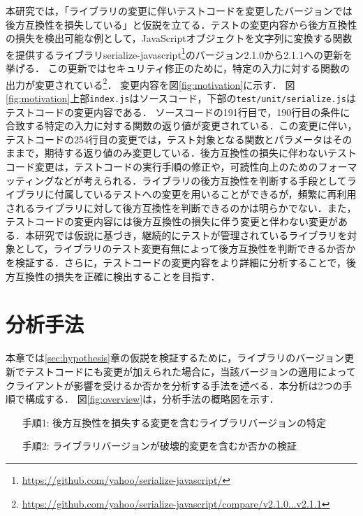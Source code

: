 \documentclass[submit]{ipsj}
\begin{document}

本研究では，「ライブラリの変更に伴いテストコードを変更したバージョンでは後方互換性を損失している」と仮説を立てる．テストの変更内容から後方互換性の損失を検出可能な例として，JavaScriptオブジェクトを文字列に変換する関数を提供するライブラリserialize-javascript\footnote{\url{https://github.com/yahoo/serialize-javascript/}}のバージョン2.1.0から2.1.1への更新を挙げる．
この更新ではセキュリティ修正のために，特定の入力に対する関数の出力が変更されている\footnote{\url{https://github.com/yahoo/serialize-javascript/compare/v2.1.0...v2.1.1}}．
変更内容を図\ref{fig:motivation}に示す．
図\ref{fig:motivation}上部{\verb|index.js|}はソースコード，下部の{\verb|test/unit/serialize.js|}はテストコードの変更内容である．
ソースコードの191行目で，190行目の条件に合致する特定の入力に対する関数の返り値が変更されている．この変更に伴い，テストコードの254行目の変更では，テスト対象となる関数とパラメータはそのままで，期待する返り値のみ変更している．後方互換性の損失に伴わないテストコード変更は，テストコードの実行手順の修正や，可読性向上のためのフォーマッティングなどが考えられる．ライブラリの後方互換性を判断する手段としてライブラリに付属しているテストへの変更を用いることができるが，頻繁に再利用されるライブラリに対して後方互換性を判断できるのかは明らかでない．また，テストコードの変更内容には後方互換性の損失に伴う変更と伴わない変更がある．本研究では仮説に基づき，継続的にテストが管理されているライブラリを対象として，ライブラリのテスト変更有無によって後方互換性を判断できるか否かを検証する．さらに，テストコードの変更内容をより詳細に分析することで，後方互換性の損失を正確に検出することを目指す．

\section{分析手法}
\label{sec:analyticalMethod}

本章では\ref{sec:hypothesis}章の仮説を検証するために，ライブラリのバージョン更新でテストコードにも変更が加えられた場合に，当該バージョンの適用によってクライアントが影響を受けるか否かを分析する手法を述べる．本分析は2つの手順で構成する．
図\ref{fig:overview}は，分析手法の概略図を示す．

\begin{enumerate}
\item[手順1: ] 後方互換性を損失する変更を含むライブラリバージョンの特定
\item[手順2: ] ライブラリバージョンが破壊的変更を含むか否かの検証
\end{enumerate}
\end{document}
